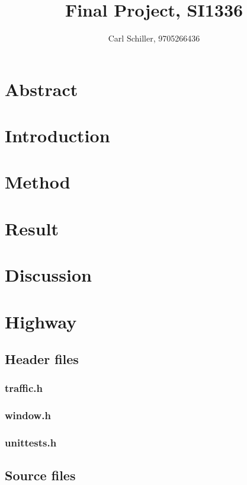 \documentclass{article}
\author{Carl Schiller, 9705266436}
\title{Final Project, SI1336}
\begin{document}
\maketitle

\section*{Abstract}

\tableofcontents

\section{Introduction}

\section{Method}

\section{Result}

\section{Discussion}

\pagebreak
\appendix

\section{Highway}
  \subsection{Header files}
    \subsubsection{traffic.h}
      
    \subsubsection{window.h}
      
    \subsubsection{unittests.h}
      
  \subsection{Source files}
\end{document}
